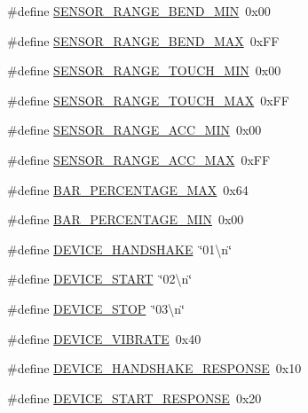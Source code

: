 \begin{DoxyCompactItemize}
\item 
\#define \hyperlink{mainwindow_8hh_a14ed3e51af1d4105255a95065eb7f482}{S\+E\+N\+S\+O\+R\+\_\+\+R\+A\+N\+G\+E\+\_\+\+B\+E\+N\+D\+\_\+\+M\+IN}~0x00
\item 
\#define \hyperlink{mainwindow_8hh_a31904e1a4a243ed5f002fc9df80ac480}{S\+E\+N\+S\+O\+R\+\_\+\+R\+A\+N\+G\+E\+\_\+\+B\+E\+N\+D\+\_\+\+M\+AX}~0x\+FF
\item 
\#define \hyperlink{mainwindow_8hh_a5775aa83e57916ac81431bdfdc180cd1}{S\+E\+N\+S\+O\+R\+\_\+\+R\+A\+N\+G\+E\+\_\+\+T\+O\+U\+C\+H\+\_\+\+M\+IN}~0x00
\item 
\#define \hyperlink{mainwindow_8hh_a4858636bd78600faf6850c075781e962}{S\+E\+N\+S\+O\+R\+\_\+\+R\+A\+N\+G\+E\+\_\+\+T\+O\+U\+C\+H\+\_\+\+M\+AX}~0x\+FF
\item 
\#define \hyperlink{mainwindow_8hh_a6bf66a2ba856548cbfc389fd682034b2}{S\+E\+N\+S\+O\+R\+\_\+\+R\+A\+N\+G\+E\+\_\+\+A\+C\+C\+\_\+\+M\+IN}~0x00
\item 
\#define \hyperlink{mainwindow_8hh_adc4efb99da7d27889b8d211aea9d82ab}{S\+E\+N\+S\+O\+R\+\_\+\+R\+A\+N\+G\+E\+\_\+\+A\+C\+C\+\_\+\+M\+AX}~0x\+FF
\item 
\#define \hyperlink{mainwindow_8hh_a512a133f28a338d26ec784d3af2b5389}{B\+A\+R\+\_\+\+P\+E\+R\+C\+E\+N\+T\+A\+G\+E\+\_\+\+M\+AX}~0x64
\item 
\#define \hyperlink{mainwindow_8hh_a4ca358d49c11518b3abaf0003606a90c}{B\+A\+R\+\_\+\+P\+E\+R\+C\+E\+N\+T\+A\+G\+E\+\_\+\+M\+IN}~0x00
\item 
\#define \hyperlink{mainwindow_8hh_a1aea80b9f33c3c15c595ca0576bb6fd2}{D\+E\+V\+I\+C\+E\+\_\+\+H\+A\+N\+D\+S\+H\+A\+KE}~\char`\"{}01\textbackslash{}n\char`\"{}
\item 
\#define \hyperlink{mainwindow_8hh_a40142f8a4b26acb64c83b65ea2bc417b}{D\+E\+V\+I\+C\+E\+\_\+\+S\+T\+A\+RT}~\char`\"{}02\textbackslash{}n\char`\"{}
\item 
\#define \hyperlink{mainwindow_8hh_acf1cd4fc85c5c7b3adcdfa82f6093c47}{D\+E\+V\+I\+C\+E\+\_\+\+S\+T\+OP}~\char`\"{}03\textbackslash{}n\char`\"{}
\item 
\#define \hyperlink{mainwindow_8hh_a4ebc5794cfe90c5a7e5f0c6fa6170013}{D\+E\+V\+I\+C\+E\+\_\+\+V\+I\+B\+R\+A\+TE}~0x40
\item 
\#define \hyperlink{mainwindow_8hh_a8df767f6a11664a01137f1f81107ceeb}{D\+E\+V\+I\+C\+E\+\_\+\+H\+A\+N\+D\+S\+H\+A\+K\+E\+\_\+\+R\+E\+S\+P\+O\+N\+SE}~0x10
\item 
\#define \hyperlink{mainwindow_8hh_aca62886712382d0a742fcfba80d80252}{D\+E\+V\+I\+C\+E\+\_\+\+S\+T\+A\+R\+T\+\_\+\+R\+E\+S\+P\+O\+N\+SE}~0x20

\end{DoxyCompactItemize}

